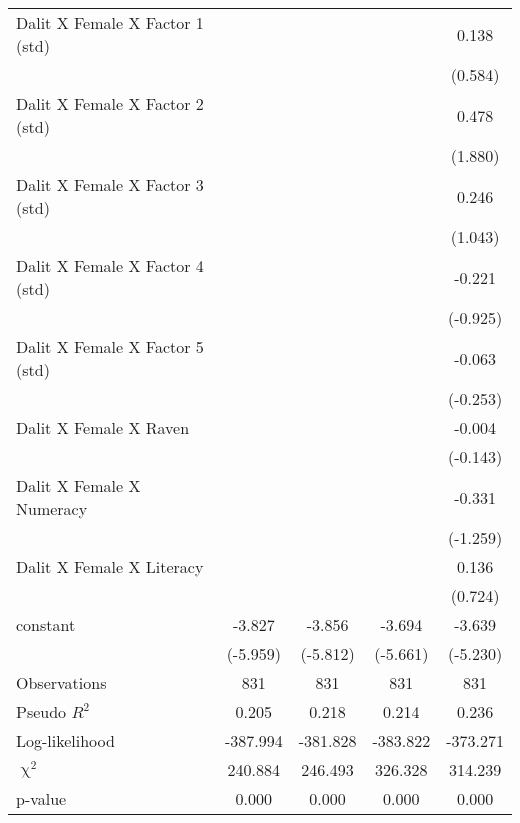 \begin{longtable}{lcccc}
    Dalit X Female X Factor 1 (std) &       &       &       & 0.138 \\
          &       &       &       & (0.584) \\
    Dalit X Female X Factor 2 (std) &       &       &       & 0.478 \\
          &       &       &       & (1.880) \\
    Dalit X Female X Factor 3 (std) &       &       &       & 0.246 \\
          &       &       &       & (1.043) \\
    Dalit X Female X Factor 4 (std) &       &       &       & -0.221 \\
          &       &       &       & (-0.925) \\
    Dalit X Female X Factor 5 (std) &       &       &       & -0.063 \\
          &       &       &       & (-0.253) \\
    Dalit X Female X Raven &       &       &       & -0.004 \\
          &       &       &       & (-0.143) \\
    Dalit X Female X Numeracy &       &       &       & -0.331 \\
          &       &       &       & (-1.259) \\
    Dalit X Female X Literacy &       &       &       & 0.136 \\
          &       &       &       & (0.724) \\
    constant & -3.827 & -3.856 & -3.694 & -3.639 \\
          & (-5.959) & (-5.812) & (-5.661) & (-5.230) \\
    \midrule
    Observations & 831   & 831   & 831   & 831 \\
    Pseudo $R^2$ & 0.205 & 0.218 & 0.214 & 0.236 \\
    Log-likelihood & -387.994 & -381.828 & -383.822 & -373.271 \\
    $\upchi^2$ & 240.884 & 246.493 & 326.328 & 314.239 \\
    p-value & 0.000 & 0.000 & 0.000 & 0.000 \\
    \bottomrule
    \end{longtable}%
